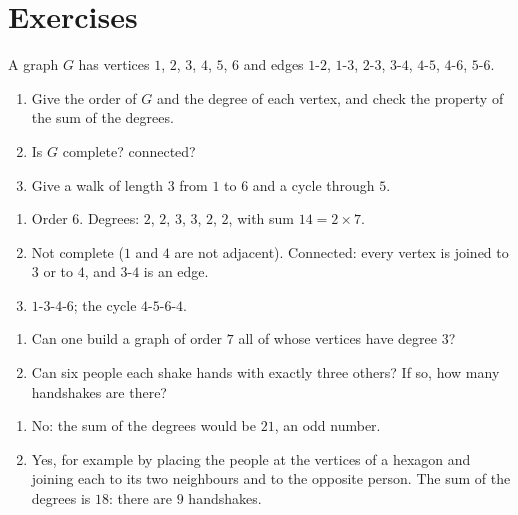 \mxnewpage
\section{Exercises}
\begin{exercise}[Vocabulary]
A graph $G$ has vertices $1$, $2$, $3$, $4$, $5$, $6$ and edges $1$-$2$, $1$-$3$, $2$-$3$, $3$-$4$, $4$-$5$, $4$-$6$, $5$-$6$.
\begin{enumerate}
\item Give the order of $G$ and the degree of each vertex, and check the property of the sum of the degrees.
\item Is $G$ complete? connected?
\item Give a walk of length $3$ from $1$ to $6$ and a cycle through $5$.
\end{enumerate}
\end{exercise}
\begin{solution}
\begin{enumerate}
\item Order $6$. Degrees: $2$, $2$, $3$, $3$, $2$, $2$, with sum $14=2\times7$.
\item Not complete ($1$ and $4$ are not adjacent). Connected: every vertex is joined to $3$ or to $4$, and $3$-$4$ is an edge.
\item $1$-$3$-$4$-$6$; the cycle $4$-$5$-$6$-$4$.
\end{enumerate}
\end{solution}

\begin{exercise}[Handshakes]
\begin{enumerate}
\item Can one build a graph of order $7$ all of whose vertices have degree $3$?
\item Can six people each shake hands with exactly three others? If so, how many handshakes are there?
\end{enumerate}
\end{exercise}
\begin{solution}
\begin{enumerate}
\item No: the sum of the degrees would be $21$, an odd number.
\item Yes, for example by placing the people at the vertices of a hexagon and joining each to its two neighbours and to the opposite person. The sum of the degrees is $18$: there are $9$ handshakes.
\end{enumerate}
\end{solution}

